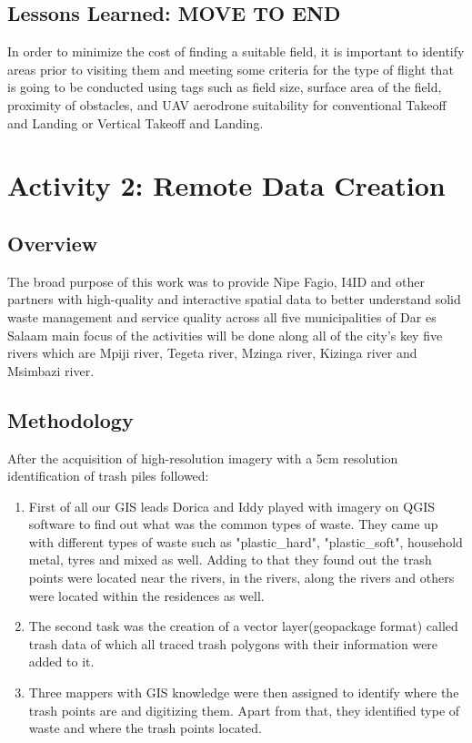 \documentclass[a4paper,12pt,twoside]{article}
\begin{document}
\subsection{Lessons Learned: MOVE TO END}
    In order to minimize the cost of finding a suitable field, it is important to identify areas prior to visiting them and meeting some criteria for the type of flight that is going to be conducted using tags such as field size, surface area of the field, proximity of obstacles, and UAV aerodrone suitability for conventional Takeoff and Landing or Vertical Takeoff and Landing.
    
\section{Activity 2: Remote Data Creation}

\subsection{Overview}
    The broad purpose of this work was to provide Nipe Fagio, I4ID and other partners with high-quality and interactive spatial data to better understand solid waste management and service quality across all five municipalities of Dar es Salaam main focus of the activities will be done along all of the city’s key five rivers which are Mpiji river, Tegeta river, Mzinga river, Kizinga river and Msimbazi river.

\subsection{Methodology}
    After the acquisition of high-resolution imagery with a 5cm resolution identification of trash piles followed:
    
        \begin{enumerate}
            \item First of all our GIS leads Dorica and Iddy played with imagery on QGIS software to find out what was the common types of waste. They came up with different types of waste such as "plastic_hard", "plastic_soft", household metal, tyres and mixed as well.
            Adding to that they found out the trash points were located near the rivers, in the rivers, along the rivers and others were located within the residences as well.
            \item The second task was the creation of a vector layer(geopackage format) called trash data of which all traced trash polygons with their information were added to it. 
            \item Three mappers with GIS knowledge were then assigned to identify where the trash points are and digitizing them. Apart from that, they identified type of waste and where the trash points located.
        \end{enumerate}
    
\end{document}
